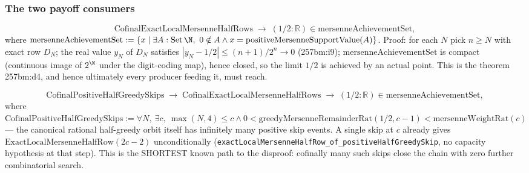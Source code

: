 \subsubsection*{The two payoff consumers}

\begin{thm}
\[
\mathrm{CofinalExactLocalMersenneHalfRows} \;\longrightarrow\; (1/2:\mathbb{R}) \in \mathrm{mersenneAchievementSet},
\]
where $\mathrm{mersenneAchievementSet} := \{x \mid \exists A:\mathrm{Set}\,\N,\ 0\notin A \wedge x = \mathrm{positiveMersenneSupportValue}(A)\}$. Proof: for each $N$ pick $n\ge N$ with exact row $D_N$; the real value $y_N$ of $D_N$ satisfies $|y_N-1/2|\le (n+1)/2^n\to0$ (257bm:i9); $\mathrm{mersenneAchievementSet}$ is compact (continuous image of $2^{\N}$ under the digit-coding map), hence closed, so the limit $1/2$ is achieved by an actual point. This is the theorem 257bm:d4, and hence ultimately every producer feeding it, must reach.
\par\noindent{}   
\end{thm}

\begin{thm}
\[
\mathrm{CofinalPositiveHalfGreedySkips} \;\longrightarrow\; \mathrm{CofinalExactLocalMersenneHalfRows} \;\longrightarrow\; (1/2:\mathbb{R})\in\mathrm{mersenneAchievementSet},
\]
where $\mathrm{CofinalPositiveHalfGreedySkips} := \forall N,\ \exists c,\ \max(N,4)\le c \wedge 0 < \mathrm{greedyMersenneRemainderRat}(1/2,c-1) < \mathrm{mersenneWeightRat}(c)$ — the canonical rational half-greedy orbit itself has infinitely many positive skip events. A single skip at $c$ already gives $\mathrm{ExactLocalMersenneHalfRow}(2c-2)$ unconditionally (\texttt{exactLocalMersenneHalfRow\_of\_positiveHalfGreedySkip}, no capacity hypothesis at that step). This is the SHORTEST known path to the disproof: cofinally many such skips close the chain with zero further combinatorial search.
\par\noindent{}     
\end{thm}

